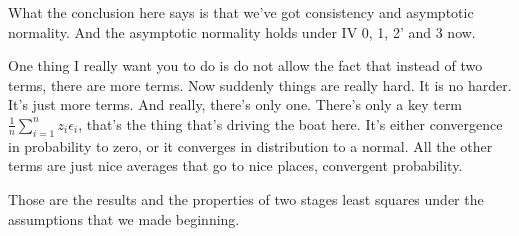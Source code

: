 \documentclass[11pt,a4paper]{amsart}
\theoremstyle{plain}
\theoremstyle{definition}
\begin{document}
 		What the conclusion here says is that we've got  consistency and asymptotic normality. And the asymptotic normality holds under IV 0, 1, 2' and 3 now.\par 
 		 One thing I really want you to do is do not allow the fact that instead of two terms, there are more terms. Now suddenly things are really hard. It is no harder. It's just more terms. And really, there's only one. There's only a key term  $\frac{1}{n}\sum_{i=1}^{n}z_{i}\epsilon_{i}$, that's the thing that's driving the boat here. It's either convergence in probability to zero, or it converges in distribution to a normal. All the other terms are just nice averages that go to nice places, convergent probability. \par 
 		 Those are the results and the properties of two stages least squares under the assumptions that we made beginning. 
\end{document}
